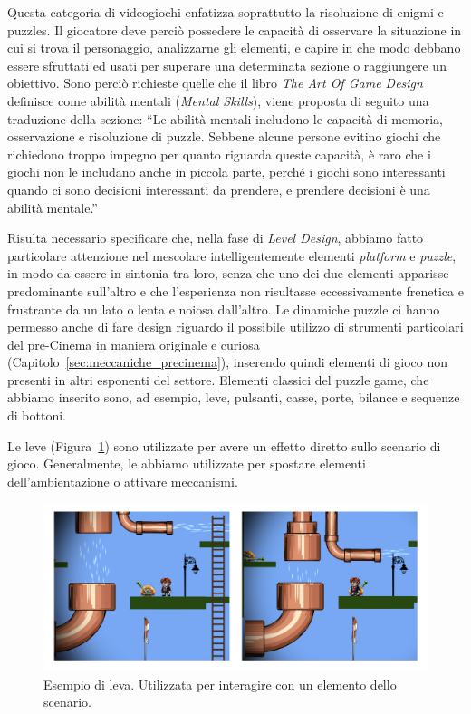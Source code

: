 Questa categoria di videogiochi enfatizza soprattutto la risoluzione di enigmi e puzzles. Il giocatore deve perciò possedere le capacità di osservare la situazione in cui si trova il personaggio, analizzarne gli elementi, e capire in che modo debbano essere sfruttati ed usati per superare una determinata sezione o raggiungere un obiettivo.
Sono perciò richieste quelle che il libro \textit{The Art Of Game Design}\cite{artOfGameDesign} definisce come abilità mentali (\textit{Mental Skills}), viene proposta di seguito una traduzione della sezione:
“Le abilità mentali includono le capacità di memoria, osservazione e risoluzione di puzzle. Sebbene alcune persone evitino giochi che richiedono troppo impegno per quanto riguarda queste capacità, è raro che i giochi non le includano anche in piccola parte, perché i giochi sono interessanti quando ci sono decisioni interessanti da prendere, e prendere decisioni è una abilità mentale.”

Risulta necessario specificare che, nella fase di \textit{Level Design}, abbiamo fatto particolare attenzione nel mescolare intelligentemente elementi \textit{platform} e \textit{puzzle}, in modo da essere in sintonia tra loro, senza che uno dei due elementi apparisse predominante sull’altro e che l’esperienza non risultasse eccessivamente frenetica e frustrante da un lato o lenta e noiosa dall’altro.
Le dinamiche puzzle ci hanno permesso anche di fare design riguardo il possibile utilizzo di strumenti particolari del pre-Cinema in maniera originale e curiosa (Capitolo~\ref{sec:meccaniche_precinema}), inserendo quindi elementi di gioco non presenti in altri esponenti del settore.
Elementi classici del puzzle game, che abbiamo inserito sono, ad esempio, leve, pulsanti, casse, porte, bilance e sequenze di bottoni.

Le leve (Figura~\ref{fig:platform_leve}) sono utilizzate per avere un effetto diretto sullo scenario di gioco. Generalmente, le abbiamo utilizzate per spostare elementi dell’ambientazione o attivare meccanismi.

\begin{figure}%
	\centering
	\includegraphics[width= \columnwidth]{images/gameDesign/09.jpg}
	\caption{Esempio di leva. Utilizzata per interagire con un elemento dello scenario.}
	\label{fig:platform_leve}
\end{figure}

